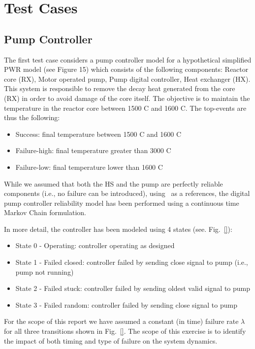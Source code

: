\section{Test Cases}
\label{sec:testCases}

\subsection{Pump Controller}
\label{sec:pumpController}

The first test case considers a pump controller model for a hypothetical simplified PWR model 
(see Figure 15) which consists of the following components: Reactor core (RX), Motor operated 
pump, Pump digital controller, Heat exchanger (HX).
This system is responsible to remove the decay heat generated from the core (RX) in order to 
avoid damage of the core itself. The objective is to maintain the temperature in the reactor 
core between 1500 C and 1600 C. The top-events are thus the following:
\begin{itemize}
  \item Success: final temperature between 1500 C and 1600 C
  \item Failure-high: final temperature greater than 3000 C
  \item Failure-low: final temperature lower than 1600 C
\end{itemize}

While we assumed that both the HS and the pump are perfectly reliable components (i.e., no 
failure can be introduced), using~\cite{} as a references, the digital pump controller 
reliability model has been performed using a continuous time Markov Chain formulation.

In more detail, the controller has been modeled using 4 states (see. Fig.~\ref{}):
\begin{itemize}
  \item State 0 - Operating: controller operating as designed
  \item State 1 - Failed closed: controller failed by sending close signal to pump (i.e., pump not running)
  \item State 2 - Failed stuck: controller failed by sending oldest valid signal to pump
  \item State 3 - Failed random: controller failed by sending close signal to pump
\end{itemize}
For the scope of this report we have assumed a constant (in time) failure rate $\lambda$ 
for all three transitions 
shown in Fig.~\ref{}. The scope of this exercise is to identify the impact of both
timing and type of failure on the system dynamics.

